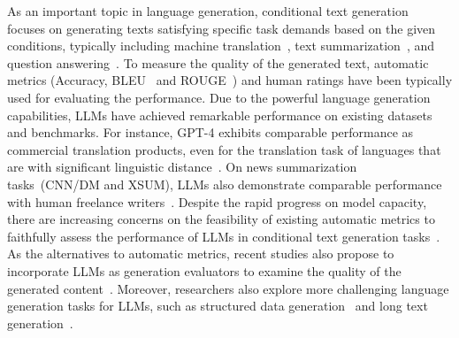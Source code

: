 As an important topic in language generation, conditional text generation~\cite{Li-IJCAI-2021-Pretrained} focuses on generating texts satisfying specific task demands based on the given conditions, typically including machine translation~\cite{Bahdanau-ICLR-2015-Neural}, text summarization~\cite{Nallapati-acl-2016-Abstractive}, and question answering~\cite{Berant-EMNLP-2013-Semantic}.
{To measure the quality of the generated text, automatic metrics (\eg Accuracy, BLEU~\cite{Papineni-acl-2002-bleu} and ROUGE~\cite{lin-acl-2004-rouge}) and human ratings have been typically used for evaluating the performance. } 
Due to the powerful language generation capabilities, LLMs have achieved remarkable performance on existing datasets and benchmarks.
{For instance, GPT-4 exhibits comparable performance as commercial translation products, {even for the translation task of languages that are with significant linguistic distance~\cite{Jiao-arxiv-2023-mt}.}
On news summarization tasks~(\ie CNN/DM and XSUM), LLMs also demonstrate comparable performance with human freelance writers~\cite{Zhang-2023-arxiv-Benchmarking}.
Despite the rapid progress on model capacity, there are increasing concerns on the feasibility of existing automatic metrics to faithfully assess the performance of LLMs in conditional text generation tasks~\cite{Zhang-2023-arxiv-Benchmarking,Goyal-2023-arxiv-News,Gehrmann-2022-arxiv-Repairing}. 
As the alternatives to automatic metrics, recent studies also propose to incorporate LLMs as generation evaluators to examine the quality of the generated content~\cite{Wang-2023-arxiv-Is,Liu-2023-arxiv-G-Eval,vicuna2023}. 
Moreover, researchers also explore more challenging language generation tasks for LLMs, such as  structured data generation~\cite{Jiang-2023-arxiv-StructGPT} and long text generation~\cite{Yang-EMNLP-2022-Re3,OpenAI-OpenAI-2023-GPT-4,Zhou-2023-arxiv-RecurrentGPT}.}



